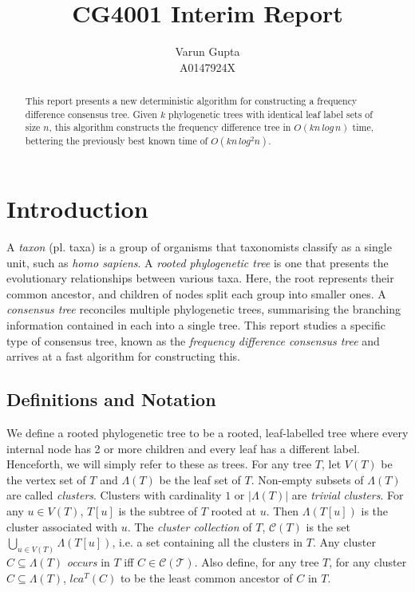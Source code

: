\documentclass{article}
\title{CG4001 Interim Report}
\author{Varun Gupta\\A0147924X}
\newcommand{\leafset}{\Lambda}
\begin{document}
    \maketitle

    \begin{abstract}
        This report presents a new deterministic algorithm for constructing a frequency difference consensus tree. Given $k$ phylogenetic trees with identical leaf label sets of size $n$, this algorithm constructs the frequency difference tree in $O(kn\,log\,n)$ time, bettering the previously best known time of $O(kn\,log^2n)$.
    \end{abstract}


    \section{Introduction}
    A \textit{taxon} (pl. taxa) is a group of organisms that taxonomists classify as a single unit, such as \textit{homo sapiens}. A \textit{rooted phylogenetic tree} is one that presents the evolutionary relationships between various taxa. Here, the root represents their common ancestor, and children of nodes split each group into smaller ones. A \textit{consensus tree} reconciles multiple phylogenetic trees, summarising the branching information contained in each into a single tree. This report studies a specific type of consensus tree, known as the \textit{frequency difference consensus tree} and arrives at a fast algorithm for constructing this.

    \subsection{Definitions and Notation}
    We define a rooted phylogenetic tree to be a rooted, leaf-labelled tree where every internal node has 2 or more children and every leaf has a different label. Henceforth, we will simply refer to these as trees. For any tree $T$, let $V(T)$ be the vertex set of $T$ and $\leafset(T)$ be the leaf set of $T$. Non-empty subsets of $\leafset(T)$ are called \textit{clusters}. Clusters with cardinality $1$ or $|\leafset(T)|$ are \textit{trivial clusters}. For any $u \in V(T)$, $T[u]$ is the subtree of $T$ rooted at $u$. Then $\leafset(T[u])$ is the cluster associated with $u$. The \textit{cluster collection} of $T$, $\mathcal{C}(T)$ is the set $\bigcup_{u \in V(T)} {\leafset(T[u])}$, i.e. a set containing all the clusters in $T$. Any cluster $C \subseteq \leafset(T)$ \textit{occurs} in $T$ iff $C \in \mathcal{C(T)}$. Also define, for any tree $T$, for any cluster $C \subseteq \leafset(T)$, $lca^T(C)$ to be the least common ancestor of $C$ in $T$.\\
\end{document}
